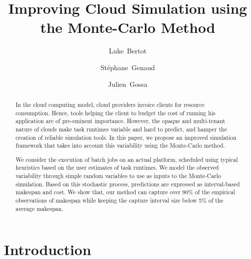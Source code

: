 \documentclass[]{llncs}
\title{Improving Cloud Simulation using the Monte-Carlo Method}
\author{Luke~Bertot
	\and Stéphane~Genaud 
	\and Julien~Gossa}
\institute{Icube-ICPS --- UMR 7357, Univeristé de Strasbourg, CNRS\\
		P\^ole API Blvd S. Bant, 67400 Illkirch%
	}
\begin{document}
\maketitle

\begin{abstract}
  In the  cloud computing  model, cloud providers  invoice clients  for resource
  consumption. Hence, tools helping the client to budget the cost of running his
  application are  of pre-eminent  importance. However, the opaque and 
  multi-tenant nature of clouds make task runtimes variable and hard to predict,
  and hamper the creation of reliable simulation tools. In this  paper, we 
  propose an improved simulation framework that takes into account this 
  variability using the Monte-Carlo method.

  We consider  the execution of  batch jobs on an actual platform, scheduled
  using typical  heuristics based on the user estimates  of task  runtimes.  We
  model  the observed  variability through  simple  random variables  to use  as
  inputs  to the  Monte-Carlo  simulation.  Based  on  this stochastic  process,
  predictions are expressed as interval-based  makespan and cost.  We show that,
  our method  can capture over  90\% of  the empirical observations  of makespan
  while keeping the capture interval size below 5\% of the average makespan.
\end{abstract}



\section{Introduction}
\end{document}
